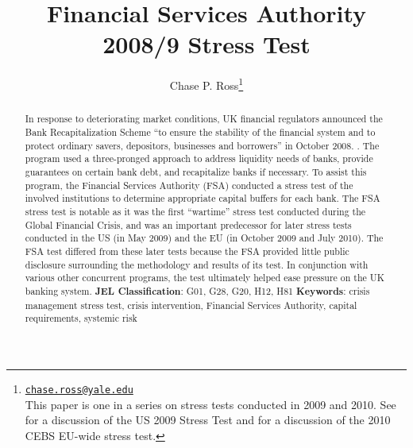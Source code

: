 \documentclass[12pt]{article}
\begin{document}
\lhead{}
\rhead{}

\renewcommand{\headrulewidth}{0.0pt}
\renewcommand{\footrulewidth}{0.0pt}


\title{Financial Services Authority 2008/9 Stress Test}%
\author{Chase P. Ross\thanks{\texttt{\href{mailto:chase.ross@yale.edu}{chase.ross@yale.edu}} \\ This paper is one in a series on stress tests conducted in 2009 and 2010. See \citet{Ross2016a} for a discussion of the US 2009 Stress Test and \citet{Ross2016b} for a discussion of the 2010 CEBS EU-wide stress test.}}



\maketitle

\begin{abstract}

In response to deteriorating market conditions, UK financial regulators announced the Bank Recapitalization Scheme ``to ensure the stability of the financial system and to protect ordinary savers, depositors, businesses and borrowers'' in October 2008. \citep{BRSAnnouncement}. The program used a three-pronged approach to address liquidity needs of banks, provide guarantees on certain bank debt, and recapitalize banks if necessary. To assist this program, the Financial Services Authority (FSA) conducted a stress test of the involved institutions to determine appropriate capital buffers for each bank. The FSA stress test is notable as it was the first ``wartime'' stress test conducted during the Global Financial Crisis, and was an important predecessor for later stress tests conducted in the US (in May 2009) and the EU (in October 2009 and July 2010). The FSA test differed from these later tests because the FSA provided little public disclosure surrounding the methodology and results of its test. In conjunction with various other concurrent programs, the test ultimately helped ease pressure on the UK banking system.
\newline
\newline
\textbf{JEL Classification}: G01, G28, G20, H12, H81
\newline
\newline
\textbf{Keywords}: crisis management stress test, crisis intervention, Financial Services Authority, capital requirements, systemic risk

\end{abstract}
\newpage
\tableofcontents
\newpage
\end{document}

